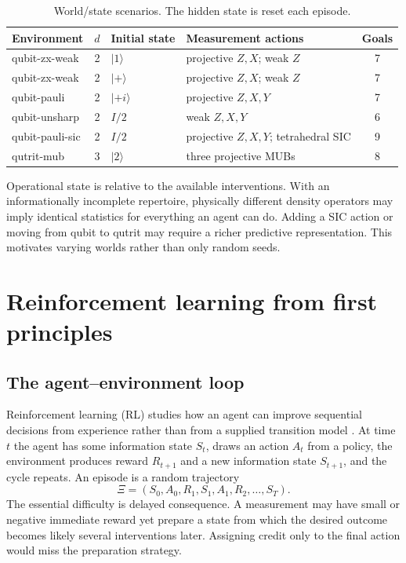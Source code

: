 \documentclass[11pt]{article}
\begin{document}
\begin{table}[t]
\centering
\caption{World/state scenarios. The hidden state is reset each episode.}
\label{tab:envs}
\begin{tabularx}{\textwidth}{@{}lclXc@{}}
\toprule
Environment & $d$ & Initial state & Measurement actions & Goals\\
\midrule
qubit-zx-weak & 2 & $|1\rangle$ & projective $Z,X$; weak $Z$ & 7\\
qubit-zx-weak & 2 & $|+\rangle$ & projective $Z,X$; weak $Z$ & 7\\
qubit-pauli & 2 & $|+i\rangle$ & projective $Z,X,Y$ & 7\\
qubit-unsharp & 2 & $I/2$ & weak $Z,X,Y$ & 6\\
qubit-pauli-sic & 2 & $I/2$ & projective $Z,X,Y$; tetrahedral SIC & 9\\
qutrit-mub & 3 & $|2\rangle$ & three projective MUBs & 8\\
\bottomrule
\end{tabularx}
\end{table}

Operational state is relative to the available interventions. With an
informationally incomplete repertoire, physically different density operators
may imply identical statistics for everything an agent can do. Adding a SIC
action or moving from qubit to qutrit may require a richer predictive
representation. This motivates varying worlds rather than only random seeds.

\section{Reinforcement learning from first principles}
\label{sec:rl}

\subsection{The agent--environment loop}

Reinforcement learning (RL) studies how an agent can improve sequential
decisions from experience rather than from a supplied transition model
\cite{sutton2018}. At time $t$ the agent has some information state $S_t$, draws
an action $A_t$ from a policy, the environment produces reward $R_{t+1}$ and a
new information state $S_{t+1}$, and the cycle repeats. An episode is a random
trajectory
\begin{equation}
 \Xi=(S_0,A_0,R_1,S_1,A_1,R_2,\ldots,S_T).
 \label{eq:rl-trajectory}
\end{equation}
The essential difficulty is delayed consequence. A measurement may have small
or negative immediate reward yet prepare a state from which the desired
outcome becomes likely several interventions later. Assigning credit only to
the final action would miss the preparation strategy.
\end{document}
